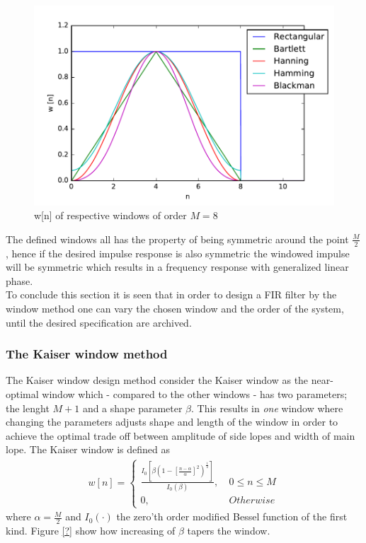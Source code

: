 \begin{figure}[H]
    \centering
    \includegraphics[scale=0.8]{figures/filter_teori/window_types.pdf}
    \caption{w[n] of respective windows of order $M = 8$}
    \label{fig:window_types}
\end{figure}  

The defined windows all has the property of being symmetric around the point $\frac{M}{2}$, hence if the desired impulse response is also symmetric the windowed impulse will be symmetric which results in a frequency response with generalized linear phase. \\
To conclude this section it is seen that in order to design a FIR filter by the window method one can vary the chosen window and the order of the system, until the desired specification are archived. 
\subsubsection{The Kaiser window method}
The Kaiser window design method consider the Kaiser window as the near-optimal window which -  compared to the other windows - has two parameters; the lenght $M+1$ and a shape parameter $\beta$. This results in \textit{one} window where changing the parameters adjusts shape and length of the window in order to achieve the optimal trade off between amplitude of side lopes and width of main lope. The Kaiser window is defined as 
\begin{align}
w[n]=\left\{\begin{matrix}
 \frac{I_0[\beta (1-[\frac{n-\alpha}{\alpha}]^2)^{\frac{1}{2}}]}{I_0(\beta)} , &\ 0 \leq n \leq M  \\ 
0, &\ Otherwise
\end{matrix}\right.
\end{align}        
where $\alpha=\frac{M}{2}$ and $I_0(\cdot)$ the zero'th order modified Bessel function of the first kind. Figure \ref{?} show how increasing of $\beta$ tapers the window. \\

